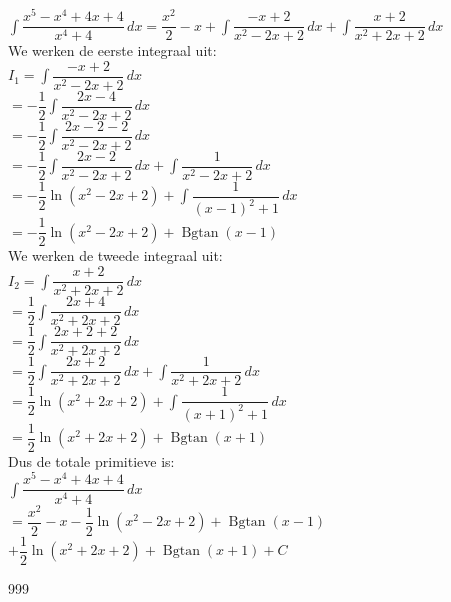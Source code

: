 \documentclass[a4paper]{article}
\newcommand{\dint}{\displaystyle\int}
\newcommand{\Bgtan}{\operatorname{Bgtan}}
\begin{document}
$\dint\dfrac{x^5-x^4+4x+4}{x^4+4}\,dx
=
\dfrac{x^2}{2}-x
+
\dint\dfrac{-x+2}{x^2-2x+2}\,dx
+
\dint\dfrac{x+2}{x^2+2x+2}\,dx$\\

We werken de eerste integraal uit:\\

$I_1=\dint\dfrac{-x+2}{x^2-2x+2}\,dx$\\

$=
-\dfrac12\dint\dfrac{2x-4}{x^2-2x+2}\,dx$\\

$=
-\dfrac12\dint\dfrac{2x-2-2}{x^2-2x+2}\,dx$\\

$=
-\dfrac12\dint\dfrac{2x-2}{x^2-2x+2}\,dx
+
\dint\dfrac{1}{x^2-2x+2}\,dx$\\

$=
-\dfrac12\ln(x^2-2x+2)
+
\dint\dfrac{1}{(x-1)^2+1}\,dx$\\

$=
-\dfrac12\ln(x^2-2x+2)
+
\Bgtan(x-1)$\\

We werken de tweede integraal uit:\\

$I_2=\dint\dfrac{x+2}{x^2+2x+2}\,dx$\\

$=
\dfrac12\dint\dfrac{2x+4}{x^2+2x+2}\,dx$\\

$=
\dfrac12\dint\dfrac{2x+2+2}{x^2+2x+2}\,dx$\\

$=
\dfrac12\dint\dfrac{2x+2}{x^2+2x+2}\,dx
+
\dint\dfrac{1}{x^2+2x+2}\,dx$\\

$=
\dfrac12\ln(x^2+2x+2)
+
\dint\dfrac{1}{(x+1)^2+1}\,dx$\\

$=
\dfrac12\ln(x^2+2x+2)
+
\Bgtan(x+1)$\\

Dus de totale primitieve is:\\

$\dint\dfrac{x^5-x^4+4x+4}{x^4+4}\,dx$\\

$=
\dfrac{x^2}{2}-x
-\dfrac12\ln(x^2-2x+2)
+\Bgtan(x-1)$\\

$+
\dfrac12\ln(x^2+2x+2)
+\Bgtan(x+1)
+C$\\

\begin{thebibliography}{999}
\end{thebibliography}
\end{document}
